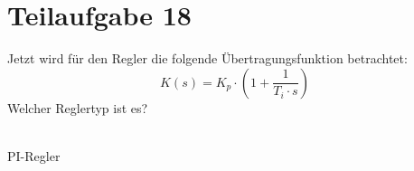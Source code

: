 \section{Teilaufgabe 18}
\begin{aufgabe}
    Jetzt wird für den Regler die folgende Übertragungsfunktion betrachtet:
    \[ K(s) = K_p \cdot \left(1 + \frac{1}{T_i \cdot s}\right) \]
    Welcher Reglertyp ist es?
\end{aufgabe}
\\
PI-Regler
